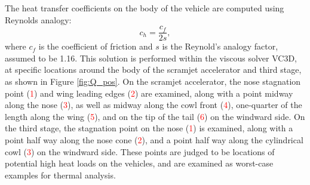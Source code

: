 The heat transfer coefficients on the body of the vehicle are computed using Reynolds analogy: 
\begin{equation}
c_h = \frac{c_f}{2s},
\end{equation}
where $c_f$ is the coefficient of friction and $s$ is the Reynold's analogy factor, assumed to be 1.16\cite{Ward2018}. 
This solution is performed within the viscous solver VC3D, at specific locations around the body of the scramjet accelerator and third stage, as shown in Figure \ref{fig:Q_pos}. On the scramjet accelerator, the nose stagnation point (\textcolor{red}{1}) and wing leading edges (\textcolor{red}{2}) are examined, along with a point midway along the nose (\textcolor{red}{3}), as well as midway along the cowl front (\textcolor{red}{4}), one-quarter of the length along the wing (\textcolor{red}{5}), and on the tip of the tail (\textcolor{red}{6}) on the windward side. On the third stage, the stagnation point on the nose (\textcolor{red}{1}) is examined, along with a point half way along the nose cone (\textcolor{red}{2}), and a point half way along the cylindrical cowl (\textcolor{red}{3}) on the windward side. These points are judged to be locations of potential high heat loads on the vehicles, and are examined as worst-case examples for thermal analysis. 

